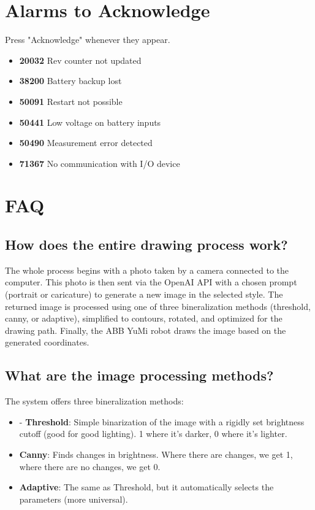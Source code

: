 \documentclass[a4paper,12pt]{article}
\begin{document}
\section{Alarms to Acknowledge}
Press "Acknowledge" whenever they appear.
\begin{itemize}
\item \textbf{20032} Rev counter not updated
\item \textbf{38200} Battery backup lost
\item \textbf{50091} Restart not possible
\item \textbf{50441} Low voltage on battery inputs
\item \textbf{50490} Measurement error detected
\item \textbf{71367} No communication with I/O device
\end{itemize}

\section{FAQ}

\subsection{How does the entire drawing process work?}
The whole process begins with a photo taken by a camera connected to the computer. This photo is then sent via the OpenAI API with a chosen prompt (portrait or caricature) to generate a new image in the selected style. The returned image is processed using one of three bineralization methods (threshold, canny, or adaptive), simplified to contours, rotated, and optimized for the drawing path. Finally, the ABB YuMi robot draws the image based on the generated coordinates.

\subsection{What are the image processing methods?}
The system offers three bineralization methods:
\begin{itemize}
\item - \textbf{Threshold}: Simple binarization of the image with a rigidly set brightness cutoff (good for good lighting). 1 where it's darker, 0 where it's lighter.
\item \textbf{Canny}: Finds changes in brightness. Where there are changes, we get 1, where there are no changes, we get 0.
\item \textbf{Adaptive}: The same as Threshold, but it automatically selects the parameters (more universal).
\end{itemize}
\end{document}
